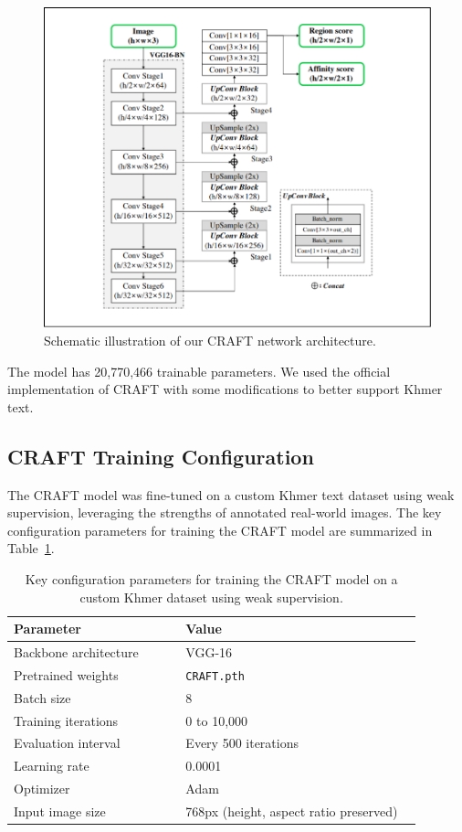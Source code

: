 \begin{figure}[H]
    \centering
    \includegraphics[width=\textwidth]{figures/craft_model.png}
    \caption{Schematic illustration of our CRAFT network architecture.
    \citep{baek2019craft}}
    \label{fig:craft-model}
\end{figure}

The model has 20,770,466 trainable parameters. We used the official 
implementation of CRAFT with some modifications to better support Khmer text. 


\subsection{CRAFT Training Configuration}
\label{subsec:craft-training-config}

The CRAFT model was fine-tuned on a custom Khmer text dataset using weak supervision, leveraging the strengths of annotated real-world images. The key configuration parameters for training the CRAFT model are summarized in Table~\ref{tab:craft-training-config}.

\begin{table}[H]
\centering
\begin{tabular}{|p{0.4\linewidth}|p{0.55\linewidth}|}
\hline
\textbf{Parameter} & \textbf{Value} \\
\hline
Backbone architecture & VGG-16 \\
Pretrained weights & \texttt{CRAFT.pth} \\
Batch size & 8 \\
Training iterations & 0 to 10,000 \\
Evaluation interval & Every 500 iterations \\
Learning rate & 0.0001 \\
Optimizer & Adam \\
Input image size & 768px (height, aspect ratio preserved) \\
\hline
\end{tabular}
\caption{Key configuration parameters for training the CRAFT model on a custom Khmer dataset 
using weak supervision.}
\label{tab:craft-training-config}
\end{table}

